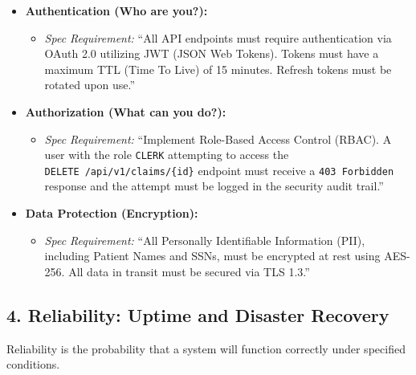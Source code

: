 \begin{itemize}
\tightlist
\item
  \textbf{Authentication (Who are you?):}

  \begin{itemize}
  \tightlist
  \item
    \emph{Spec Requirement:} ``All API endpoints must require
    authentication via OAuth 2.0 utilizing JWT (JSON Web Tokens). Tokens
    must have a maximum TTL (Time To Live) of 15 minutes. Refresh tokens
    must be rotated upon use.''
  \end{itemize}
\item
  \textbf{Authorization (What can you do?):}

  \begin{itemize}
  \tightlist
  \item
    \emph{Spec Requirement:} ``Implement Role-Based Access Control
    (RBAC). A user with the role \texttt{CLERK} attempting to access the
    \texttt{DELETE\ /api/v1/claims/\{id\}} endpoint must receive a
    \texttt{403\ Forbidden} response and the attempt must be logged in
    the security audit trail.''
  \end{itemize}
\item
  \textbf{Data Protection (Encryption):}

  \begin{itemize}
  \tightlist
  \item
    \emph{Spec Requirement:} ``All Personally Identifiable Information
    (PII), including Patient Names and SSNs, must be encrypted at rest
    using AES-256. All data in transit must be secured via TLS 1.3.''
  \end{itemize}
\end{itemize}

\subsection{4. Reliability: Uptime and Disaster
Recovery}\label{reliability-uptime-and-disaster-recovery}

Reliability is the probability that a system will function correctly
under specified conditions.

